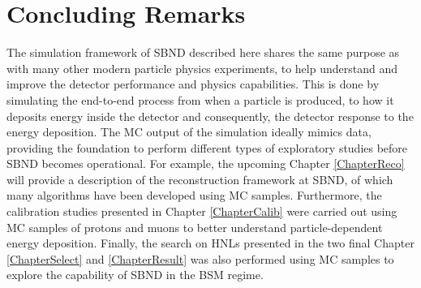 \section{Concluding Remarks}
\label{sec:sim_concluding_remarks}

The simulation framework of SBND described here shares the same purpose as with many other modern particle physics experiments, to help understand and improve the detector performance and physics capabilities.
This is done by simulating the end-to-end process from when a particle is produced, to how it deposits energy inside the detector and consequently, the detector response to the energy deposition.
The MC output of the simulation ideally mimics data, providing the foundation to perform different types of exploratory studies before SBND becomes operational.
For example, the upcoming Chapter \ref{ChapterReco} will provide a description of the reconstruction framework at SBND, of which many algorithms have been developed using MC samples.
Furthermore, the calibration studies presented in Chapter \ref{ChapterCalib} were carried out using MC samples of protons and muons to better understand particle-dependent energy deposition.
Finally, the search on HNLs presented in the two final Chapter \ref{ChapterSelect} and \ref{ChapterResult} was also performed using MC samples to explore the capability of SBND in the BSM regime.
